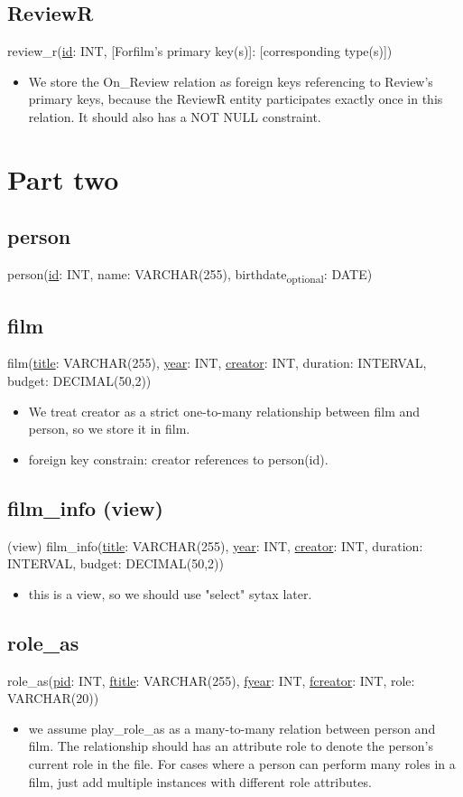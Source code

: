 \documentclass[11pt,fleqn]{exam}
\begin{document}
\subsection*{ReviewR}
review\_r(\underline{id}: INT, [Forfilm's primary key(s)]: [corresponding type(s)])
\begin{itemize}
\item We store the On\_Review relation as foreign keys referencing to Review's primary keys, because the ReviewR entity participates exactly once in this relation.  It should also has a NOT NULL constraint.
\end{itemize}

\section*{Part two}
\subsection*{person}
person(\underline{id}: INT, name: VARCHAR(255), birthdate\textsubscript{optional}: DATE)
\subsection*{film}
film(\underline{title}: VARCHAR(255), \underline{year}: INT, \underline{creator}: INT, duration: INTERVAL, budget: DECIMAL(50,2))
\begin{itemize}
\item We treat creator as a strict one-to-many relationship between film and person, so we store it in film.
\item foreign key constrain: creator references to person(id).
\end{itemize}
\subsection*{film\_info (view)}
(view) film\_info(\underline{title}: VARCHAR(255), \underline{year}: INT, \underline{creator}: INT, duration: INTERVAL, budget: DECIMAL(50,2))
\begin{itemize}
\item this is a view, so we should use "select" sytax later.
\end{itemize}
\subsection*{role\_as}
role\_as(\underline{pid}: INT, \underline{ftitle}: VARCHAR(255), \underline{fyear}: INT, \underline{fcreator}: INT, role: VARCHAR(20))
\begin{itemize}
\item we assume play\_role\_as as a many-to-many relation between person and film. The relationship should has an attribute role to denote the person's current role in the file. For cases where a person can perform many roles in a film, just add multiple instances with different role attributes.
\end{itemize}
\end{document}
